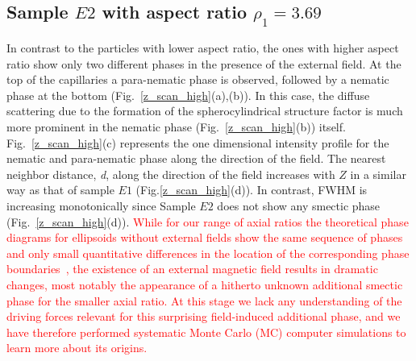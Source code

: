 \documentclass[aps,prl,preprint,superscriptaddress]{revtex4-1} %
\begin{document}
\subsection{Sample $E2$ with aspect ratio $\rho_1 = 3.69$}
In contrast to the particles with lower aspect ratio, the ones with higher aspect ratio show only two different phases in the presence of the external field. At the top of the capillaries a para-nematic phase is observed, followed by a nematic phase at the bottom (Fig.~\ref{z_scan_high}(a),(b)). In this case, the diffuse scattering due to the formation of the spherocylindrical structure factor is much more prominent in the nematic phase (Fig.~\ref{z_scan_high}(b)) itself. Fig.~\ref{z_scan_high}(c) represents the one dimensional intensity profile for the nematic and para-nematic phase along the direction of the field. The nearest neighbor distance, \emph{d}, along the direction of the field increases with $Z$ in a similar way as that of sample $E1$ (Fig.\ref{z_scan_high}(d)). In contrast, FWHM is increasing monotonically since Sample $E2$ does not show any smectic phase (Fig.~\ref{z_scan_high}(d)).   \textcolor{red}{While for our range of axial ratios the theoretical phase diagrams for ellipsoids without external fields show the same sequence of phases and only small quantitative differences in the location of the corresponding phase boundaries~\cite{radu2009solid, odriozola2012revisiting, pfleiderer2008crystal}, the existence of an external magnetic field results in dramatic changes, most notably the appearance of a hitherto unknown additional smectic phase for the smaller axial ratio. At this stage we lack any understanding of the driving forces relevant for this surprising field-induced additional phase, and we have therefore performed systematic Monte Carlo (MC) computer simulations to learn more about its origins. } \par


\end{document}
